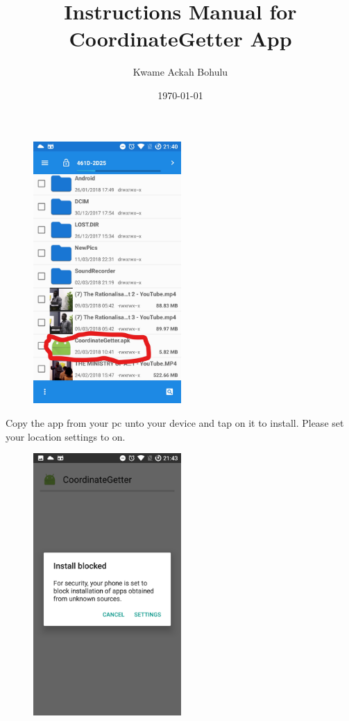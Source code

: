 \documentclass[fontsize=25pt]{scrbook}
\title{Instructions Manual for CoordinateGetter App}
\author{Kwame Ackah Bohulu}
\date{\today}
\begin{document}
\maketitle

\newpage
\begin{center}
\begin{figure}
		\includegraphics[height=10cm]{Screenshot_1_LI.jpg}
		
		\end{figure}
	\end{center}
Copy the app from your pc unto your device and tap on it to install. Please set your location settings to on.
\newpage
\begin{center}
\begin{figure}
		\includegraphics[height=10cm]{Screenshot_2.png}
		
		\end{figure}
	\end{center}
\end{document}
